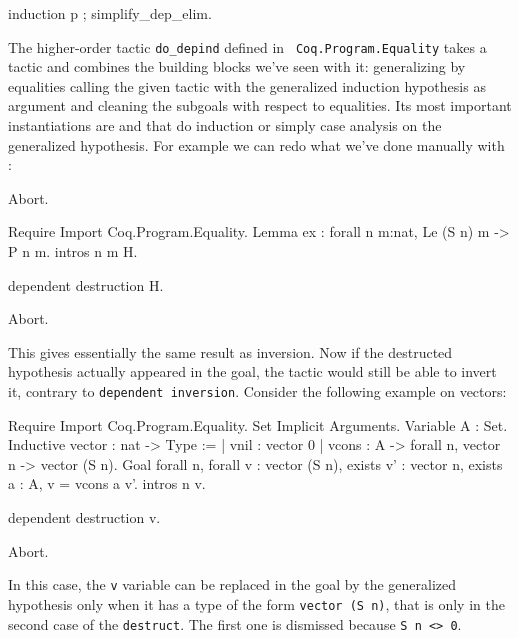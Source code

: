 \begin{coq_example*}
\begin{coq_example}
induction p ; simplify_dep_elim.
\end{coq_example}

The higher-order tactic {\tt do\_depind} defined in {\tt
  Coq.Program.Equality} takes a tactic and combines the
building blocks we've seen with it: generalizing by equalities 
calling the given tactic with the
generalized induction hypothesis as argument and cleaning the subgoals
with respect to equalities. Its most important instantiations are
\depind and \depdestr that do induction or simply case analysis on the
generalized hypothesis. For example we can redo what we've done manually
with \depdestr:

\begin{coq_eval}
Abort.
\end{coq_eval}
\begin{coq_example*}
Require Import Coq.Program.Equality.
Lemma ex : forall n m:nat, Le (S n) m -> P n m.
intros n m H.
\end{coq_example*}
\begin{coq_example}
dependent destruction H.
\end{coq_example}
\begin{coq_eval}
Abort.
\end{coq_eval}

This gives essentially the same result as inversion. Now if the
destructed hypothesis actually appeared in the goal, the tactic would
still be able to invert it, contrary to {\tt dependent
 inversion}. Consider the following example on vectors:

\begin{coq_example*}
Require Import Coq.Program.Equality.
Set Implicit Arguments.
Variable A : Set.
Inductive vector : nat -> Type := 
| vnil : vector 0 
| vcons : A -> forall n, vector n -> vector (S n).
Goal forall n, forall v : vector (S n), 
  exists v' : vector n, exists a : A, v = vcons a v'.
  intros n v.
\end{coq_example*}
\begin{coq_example}
  dependent destruction v.
\end{coq_example}
\begin{coq_eval}
Abort.
\end{coq_eval}

In this case, the {\tt v} variable can be replaced in the goal by the
generalized hypothesis only when it has a type of the form {\tt vector
 (S n)}, that is only in the second case of the {\tt destruct}. The
first one is dismissed because {\tt S n <> 0}.


\end{coq_example*}
